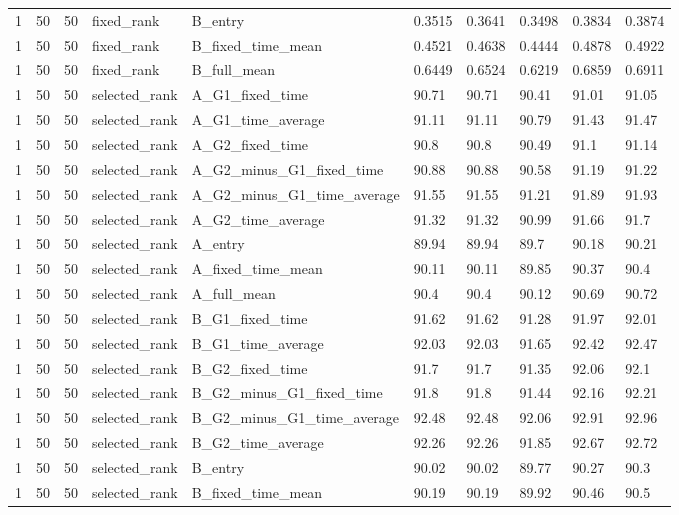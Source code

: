 \begin{longtable}{llllllllll}
1 & 50 & 50 & fixed\_rank & B\_entry & 0.3515 & 0.3641 & 0.3498 & 0.3834 & 0.3874 \\
1 & 50 & 50 & fixed\_rank & B\_fixed\_time\_mean & 0.4521 & 0.4638 & 0.4444 & 0.4878 & 0.4922 \\
1 & 50 & 50 & fixed\_rank & B\_full\_mean & 0.6449 & 0.6524 & 0.6219 & 0.6859 & 0.6911 \\
1 & 50 & 50 & selected\_rank & A\_G1\_fixed\_time & 90.71 & 90.71 & 90.41 & 91.01 & 91.05 \\
1 & 50 & 50 & selected\_rank & A\_G1\_time\_average & 91.11 & 91.11 & 90.79 & 91.43 & 91.47 \\
1 & 50 & 50 & selected\_rank & A\_G2\_fixed\_time & 90.8 & 90.8 & 90.49 & 91.1 & 91.14 \\
1 & 50 & 50 & selected\_rank & A\_G2\_minus\_G1\_fixed\_time & 90.88 & 90.88 & 90.58 & 91.19 & 91.22 \\
1 & 50 & 50 & selected\_rank & A\_G2\_minus\_G1\_time\_average & 91.55 & 91.55 & 91.21 & 91.89 & 91.93 \\
1 & 50 & 50 & selected\_rank & A\_G2\_time\_average & 91.32 & 91.32 & 90.99 & 91.66 & 91.7 \\
1 & 50 & 50 & selected\_rank & A\_entry & 89.94 & 89.94 & 89.7 & 90.18 & 90.21 \\
1 & 50 & 50 & selected\_rank & A\_fixed\_time\_mean & 90.11 & 90.11 & 89.85 & 90.37 & 90.4 \\
1 & 50 & 50 & selected\_rank & A\_full\_mean & 90.4 & 90.4 & 90.12 & 90.69 & 90.72 \\
1 & 50 & 50 & selected\_rank & B\_G1\_fixed\_time & 91.62 & 91.62 & 91.28 & 91.97 & 92.01 \\
1 & 50 & 50 & selected\_rank & B\_G1\_time\_average & 92.03 & 92.03 & 91.65 & 92.42 & 92.47 \\
1 & 50 & 50 & selected\_rank & B\_G2\_fixed\_time & 91.7 & 91.7 & 91.35 & 92.06 & 92.1 \\
1 & 50 & 50 & selected\_rank & B\_G2\_minus\_G1\_fixed\_time & 91.8 & 91.8 & 91.44 & 92.16 & 92.21 \\
1 & 50 & 50 & selected\_rank & B\_G2\_minus\_G1\_time\_average & 92.48 & 92.48 & 92.06 & 92.91 & 92.96 \\
1 & 50 & 50 & selected\_rank & B\_G2\_time\_average & 92.26 & 92.26 & 91.85 & 92.67 & 92.72 \\
1 & 50 & 50 & selected\_rank & B\_entry & 90.02 & 90.02 & 89.77 & 90.27 & 90.3 \\
1 & 50 & 50 & selected\_rank & B\_fixed\_time\_mean & 90.19 & 90.19 & 89.92 & 90.46 & 90.5 \\

\end{longtable}

